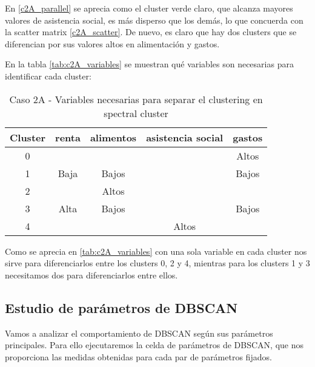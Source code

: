 En \eqref{c2A_parallel} se aprecia como el cluster verde claro, que alcanza mayores valores de asistencia social, es más disperso que los demás, lo que concuerda con la scatter matrix \eqref{c2A_scatter}. De nuevo, es claro que hay dos clusters que se diferencian por sus valores altos en alimentación y gastos.

En la tabla  \eqref{tab:c2A_variables} se muestran qué variables son necesarias para identificar cada cluster:

\begin{table}[H]
\centering
\caption{Caso 2A - Variables necesarias para separar el clustering en spectral cluster}
\label{tab:c2A_variables}
\begin{tabular}{ccccc}
\toprule
 Cluster & renta & alimentos & asistencia social & gastos \\
\midrule
0 & & & & Altos \\
1 & Baja & Bajos & & Bajos \\
2 & & Altos & & \\
3 & Alta & Bajos & & Bajos \\
4 & & & Altos & \\
\bottomrule
\end{tabular}
\end{table}
Como se aprecia en \eqref{tab:c2A_variables} con una sola variable en cada cluster nos sirve para diferenciarlos entre los clusters 0, 2 y 4, mientras para los clusters 1 y 3 necesitamos dos para diferenciarlos entre ellos.

\subsection{Estudio de parámetros de DBSCAN}

Vamos a analizar el comportamiento de DBSCAN según sus parámetros principales. Para ello ejecutaremos la celda de parámetros de DBSCAN, que nos proporciona las medidas obtenidas para cada par de parámetros fijados.

